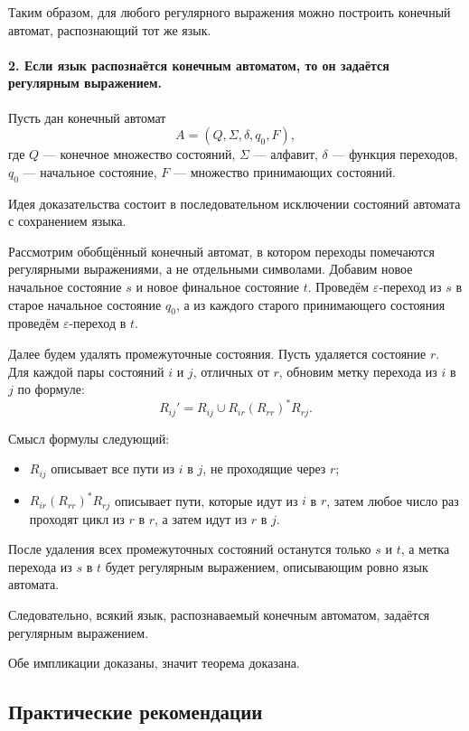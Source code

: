 \documentclass[12pt,a4paper]{article}
\begin{document}
Таким образом, для любого регулярного выражения можно построить конечный автомат, распознающий тот же язык.

\paragraph{2. Если язык распознаётся конечным автоматом, то он задаётся регулярным выражением.}

Пусть дан конечный автомат
\[
    A = (Q, \Sigma, \delta, q_0, F),
\]
где $Q$ --- конечное множество состояний, $\Sigma$ --- алфавит, $\delta$ --- функция переходов, $q_0$ --- начальное состояние, $F$ --- множество принимающих состояний.

Идея доказательства состоит в последовательном исключении состояний автомата с сохранением языка.

Рассмотрим обобщённый конечный автомат, в котором переходы помечаются регулярными выражениями, а не отдельными символами. Добавим новое начальное состояние $s$ и новое финальное состояние $t$. Проведём $\varepsilon$-переход из $s$ в старое начальное состояние $q_0$, а из каждого старого принимающего состояния проведём $\varepsilon$-переход в $t$.

Далее будем удалять промежуточные состояния. Пусть удаляется состояние $r$. Для каждой пары состояний $i$ и $j$, отличных от $r$, обновим метку перехода из $i$ в $j$ по формуле:
\[
    R_{ij}' = R_{ij} \cup R_{ir}(R_{rr})^*R_{rj}.
\]

Смысл формулы следующий:

\begin{itemize}
    \item $R_{ij}$ описывает все пути из $i$ в $j$, не проходящие через $r$;
    \item $R_{ir}(R_{rr})^*R_{rj}$ описывает пути, которые идут из $i$ в $r$, затем любое число раз проходят цикл из $r$ в $r$, а затем идут из $r$ в $j$.
\end{itemize}

После удаления всех промежуточных состояний останутся только $s$ и $t$, а метка перехода из $s$ в $t$ будет регулярным выражением, описывающим ровно язык автомата.

Следовательно, всякий язык, распознаваемый конечным автоматом, задаётся регулярным выражением.

Обе импликации доказаны, значит теорема доказана.

\subsection{Практические рекомендации}
\end{document}
